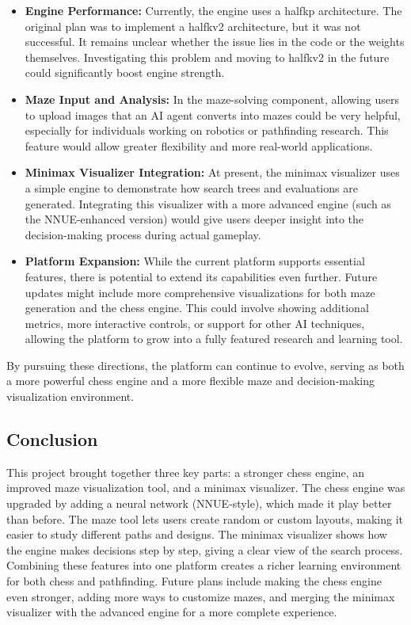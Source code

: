 \documentclass[12pt,a4paper]{article}
\begin{document}
\begin{itemize}
    \item \textbf{Engine Performance:} Currently, the engine uses a halfkp
    architecture. The original plan was to implement a halfkv2 architecture,
    but it was not successful. It remains unclear whether the issue lies in the
    code or the weights themselves. Investigating this problem and moving to
    halfkv2 in the future could significantly boost engine strength.

    \item \textbf{Maze Input and Analysis:} In the maze-solving component,
    allowing users to upload images that an AI agent converts into mazes
    could be very helpful, especially for individuals working on robotics or
    pathfinding research. This feature would allow greater flexibility and
    more real-world applications.

    \item \textbf{Minimax Visualizer Integration:} At present, the minimax
    visualizer uses a simple engine to demonstrate how search trees and
    evaluations are generated. Integrating this visualizer with a more advanced
    engine (such as the NNUE-enhanced version) would give users deeper insight
    into the decision-making process during actual gameplay.

    \item \textbf{Platform Expansion:} While the current platform supports
    essential features, there is potential to extend its capabilities even
    further. Future updates might include more comprehensive visualizations
    for both maze generation and the chess engine. This could involve showing
    additional metrics, more interactive controls, or support for other AI
    techniques, allowing the platform to grow into a fully featured research
    and learning tool.
\end{itemize}

By pursuing these directions, the platform can continue to evolve, serving as
both a more powerful chess engine and a more flexible maze and decision-making
visualization environment.

\subsection{Conclusion}
\label{sec:conclusion}
This project brought together three key parts: a stronger chess engine, an improved maze visualization tool, and a minimax visualizer. The chess engine was upgraded by adding a neural network (NNUE-style), which made it play better than before. The maze tool lets users create random or custom layouts, making it easier to study different paths and designs. The minimax visualizer shows how the engine makes decisions step by step, giving a clear view of the search process. Combining these features into one platform creates a richer learning environment for both chess and pathfinding. Future plans include making the chess engine even stronger, adding more ways to customize mazes, and merging the minimax visualizer with the advanced engine for a more complete experience.
\end{document}

